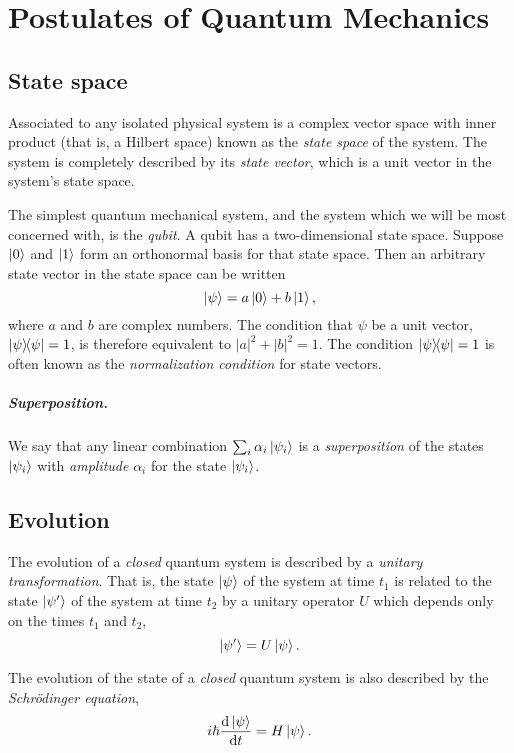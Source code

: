\chapter{Postulates of Quantum Mechanics}

\section{State space}

\begin{postulate}
  Associated to any isolated physical system is a complex vector space with
  inner product (that is, a Hilbert space) known as the \emph{state space} of
  the system. The system is completely described by its \emph{state vector},
  which is a unit vector in the system's state space.
\end{postulate}

The simplest quantum mechanical system, and the system which we will be most
concerned with, is the \emph{qubit}. A qubit has a two-dimensional state space.
Suppose $\ket{0}$ and $\ket{1}$ form an orthonormal basis for that state space.
Then an arbitrary state vector in the state space can be written
\begin{equation*}
  \ket{\psi} = a\ket{0} + b\ket{1},
\end{equation*} where $a$ and $b$ are complex numbers. The condition that
$\psi$ be a unit vector, $\ketbra{\psi}{\psi} = 1$, is therefore equivalent to
$|a|^2 + |b|^2 = 1$. The condition $\ketbra{\psi}{\psi} = 1$ is often known as
the \emph{normalization condition} for state vectors.

\paragraph{Superposition.} We say that any linear combination $\sum_i \alpha_i
\ket{\psi_i}$ is a \emph{superposition} of the states $\ket{\psi_i}$ with
\emph{amplitude} $\alpha_i$ for the state $\ket{\psi_i}$.

\section{Evolution}

\begin{postulate}
  The evolution of a \emph{closed} quantum system is described by a
  \emph{unitary transformation}. That is, the state $\ket{\psi}$ of the system
  at time $t_1$ is related to the state $\ket{\psi'}$ of the system at time
  $t_2$ by a unitary operator $U$ which depends only on the times $t_1$ and
  $t_2$, \begin{equation*}
    \ket{\psi'} = U\ket{\psi}.
  \end{equation*}

  The evolution of the state of a \emph{closed} quantum system is also
  described by the \emph{Schr{\"o}dinger equation}, \begin{equation}
    i\hbar\frac{\mathrm{d}\ket{\psi}}{\mathrm{d}t} = H\ket{\psi}.
      \label{eq:sch-eq}
  \end{equation}
\end{postulate}

